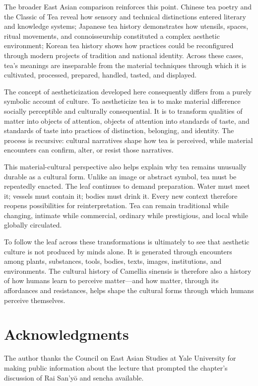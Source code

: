 \documentclass[11pt,a4paper]{article}
\begin{document}
The broader East Asian comparison reinforces this point. Chinese tea poetry and the Classic of Tea reveal how sensory and technical distinctions entered literary and knowledge systems; Japanese tea history demonstrates how utensils, spaces, ritual movements, and connoisseurship constituted a complex aesthetic environment; Korean tea history shows how practices could be reconfigured through modern projects of tradition and national identity. Across these cases, tea's meanings are inseparable from the material techniques through which it is cultivated, processed, prepared, handled, tasted, and displayed.

The concept of aestheticization developed here consequently differs from a purely symbolic account of culture. To aestheticize tea is to make material difference socially perceptible and culturally consequential. It is to transform qualities of matter into objects of attention, objects of attention into standards of taste, and standards of taste into practices of distinction, belonging, and identity. The process is recursive: cultural narratives shape how tea is perceived, while material encounters can confirm, alter, or resist those narratives.

This material-cultural perspective also helps explain why tea remains unusually durable as a cultural form. Unlike an image or abstract symbol, tea must be repeatedly enacted. The leaf continues to demand preparation. Water must meet it; vessels must contain it; bodies must drink it. Every new context therefore reopens possibilities for reinterpretation. Tea can remain traditional while changing, intimate while commercial, ordinary while prestigious, and local while globally circulated.

To follow the leaf across these transformations is ultimately to see that aesthetic culture is not produced by minds alone. It is generated through encounters among plants, substances, tools, bodies, texts, images, institutions, and environments. The cultural history of Camellia sinensis is therefore also a history of how humans learn to perceive matter---and how matter, through its affordances and resistances, helps shape the cultural forms through which humans perceive themselves.

\section*{Acknowledgments}

The author thanks the Council on East Asian Studies at Yale University for making public information about the lecture that prompted the chapter's discussion of Rai San'yō and sencha available.
\end{document}
